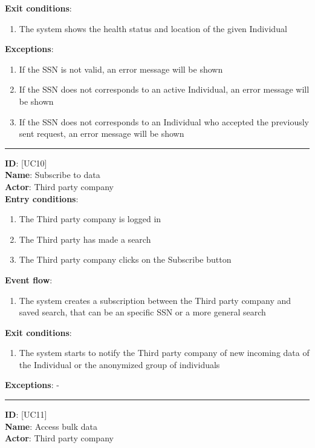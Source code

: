 \documentclass[12pt]{report}
\newcommand\usecase[1]{ [UC#1] }
\begin{document}
\begin{itemize}
\begin{enumerate}
  		\end{enumerate}
  	\textbf{Exit conditions}:
  		\begin{enumerate}
    			\item{The system shows the health status and location of the given Individual}
  		\end{enumerate}
  	\textbf{Exceptions}: 
  		\begin{enumerate}
    			\item{If the SSN is not valid, an error message will be shown}
    			\item{If the SSN does not corresponds to an active Individual, an error message will be shown}
    			\item{If the SSN does not corresponds to an Individual who accepted the previously sent request, an error message will be shown}
  		\end{enumerate}
  	\rule{\linewidth}{0.4pt}
  	\textbf{ID}: \usecase{10} \\
  	\textbf{Name}: Subscribe to data \\
    \textbf{Actor}: Third party company \\
    \textbf{Entry conditions}:
    		\begin{enumerate}
    			\item{The Third party company is logged in}
    			\item{The Third party has made a search}
    			\item{The Third party company clicks on the Subscribe button}
  		\end{enumerate}
  	\textbf{Event flow}:
  		\begin{enumerate}
    			\item{The system creates a subscription between the Third party company and saved search, that can be an specific SSN or a more general search}
  		\end{enumerate}
  	\textbf{Exit conditions}:
  		\begin{enumerate}
    			\item{The system starts to notify the Third party company of new incoming data of the Individual or the anonymized group of individuals}
  		\end{enumerate}
  	\textbf{Exceptions}:  - \\
  	\rule{\linewidth}{0.4pt}
  	\textbf{ID}: \usecase{11} \\
  	\textbf{Name}: Access bulk data \\
    \textbf{Actor}: Third party company \\

\end{itemize}
\end{document}

